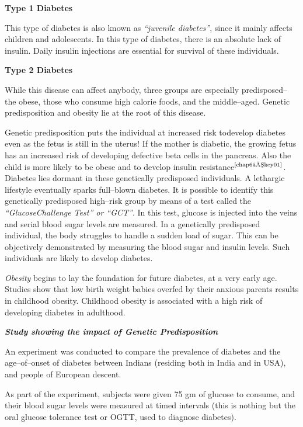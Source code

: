 \noindent
\textbf{Type 1 Diabetes}

This type of diabetes is also known as \textit{“juvenile diabetes”}, since it mainly affects children and adolescents. In this type of diabetes, there is an absolute lack of insu\-lin. Daily insulin injections are essential for survival of these individuals.

\noindent
\textbf{Type 2 Diabetes}

While this disease can affect anybody, three groups are especially predisposed– the obese, those who consume high calorie foods, and the middle–aged. Genetic predisposition and obesity lie at the root of this disease.

Genetic predisposition puts the individual at increased risk to\break develop diabetes even as the fetus is still in the uterus! If the mother is diabetic, the growing fetus has an increased risk of developing defe\-ctive beta cells in the pancreas. Also the child is more likely to be obese and to develop insulin resistance$^{\text{\cite{chap6–key01}}}$. Diabetes lies dormant in these genetically predisposed individuals. A lethargic lifestyle eve\-ntually sparks full–blown diabetes. It is possible to identify this genetically predisposed high–risk group by means of a test called the \textit{“Glucose\break Challenge Test” or “GCT”}. In this test, glucose is injected into the veins and serial blood sugar levels are measured. In a genetically predisposed individual, the body struggles to handle a sudden load of sugar. This can be objectively demonstrated by measuring the blood sugar and insulin levels. Such individuals are likely to develop diabetes.

\textit{Obesity} begins to lay the foundation for future diabetes, at a very early age. Studies show that low birth weight babies overfed by their anxious parents results in childhood obesity. Childhood obesity is asso\-ciated with a high risk of developing diabetes in adulthood.

\noindent
\textbf{\textit{Study showing the impact of Genetic Predisposition}}

An experiment was conducted to compare the prevalence of diabetes and the age–of–onset of diabetes between Indians (residing both in India and in USA), and people of European descent.

As part of the experiment, subjects were given 75 gm of glucose to consume, and their blood sugar levels were measured at timed intervals (this is nothing but the oral glucose tolerance test or OGTT, used to diagnose diabetes).

